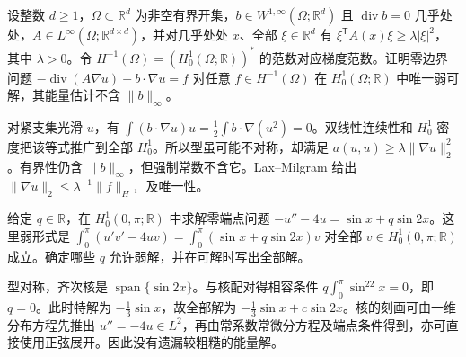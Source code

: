 \begin{exercise}\label{b2:ex:15-divergence-free-drift}
设整数 \(d\ge1\)，\(\Omega\subset\mathbb R^d\) 为非空有界开集，\(b\in W^{1,\infty}(\Omega;\mathbb R^d)\) 且 \(\operatorname{div}b=0\) 几乎处处，\(A\in L^\infty(\Omega;\mathbb R^{d\times d})\)，并对几乎处处 \(x\)、全部 \(\xi\in\mathbb R^d\) 有 \(\xi^{\mathsf T}A(x)\xi\ge\lambda|\xi|^2\)，其中 \(\lambda>0\)。令 \(H^{-1}(\Omega)=(H_0^1(\Omega;\mathbb R))^*\) 的范数对应梯度范数。证明零边界问题 \(-\operatorname{div}(A\nabla u)+b\cdot\nabla u=f\) 对任意 \(f\in H^{-1}(\Omega)\) 在 \(H_0^1(\Omega;\mathbb R)\) 中唯一弱可解，其能量估计不含 \(\lVert b\rVert_\infty\)。
\end{exercise}
\begin{solution}
对紧支集光滑 \(u\)，有 \(\int(b\cdot\nabla u)u=\tfrac12\int b\cdot\nabla(u^2)=0\)。双线性连续性和 \(H_0^1\) 密度把该等式推广到全部 \(H_0^1\)。所以型虽可能不对称，却满足 \(a(u,u)\ge\lambda\lVert\nabla u\rVert_2^2\)。有界性仍含 \(\lVert b\rVert_\infty\)，但强制常数不含它。Lax--Milgram 给出 \(\lVert\nabla u\rVert_2\le\lambda^{-1}\lVert f\rVert_{H^{-1}}\) 及唯一性。
\end{solution}

\begin{optionalexercise}\label{b2:ex:15-resonance}
给定 \(q\in\mathbb R\)，在 \(H_0^1(0,\pi;\mathbb R)\) 中求解零端点问题 \(-u''-4u=\sin x+q\sin2x\)。这里弱形式是 \(\int_0^\pi(u'v'-4uv)=\int_0^\pi(\sin x+q\sin2x)v\) 对全部 \(v\in H_0^1(0,\pi;\mathbb R)\) 成立。确定哪些 \(q\) 允许弱解，并在可解时写出全部解。
\end{optionalexercise}
\begin{solution}
型对称，齐次核是 \(\operatorname{span}\{\sin2x\}\)。与核配对得相容条件 \(q\int_0^\pi\sin^22x=0\)，即 \(q=0\)。此时特解为 \(-\tfrac13\sin x\)，故全部解为 \(-\tfrac13\sin x+c\sin2x\)。核的刻画可由一维分布方程先推出 \(u''=-4u\in L^2\)，再由常系数常微分方程及端点条件得到，亦可直接使用正弦展开。因此没有遗漏较粗糙的能量解。
\end{solution}
